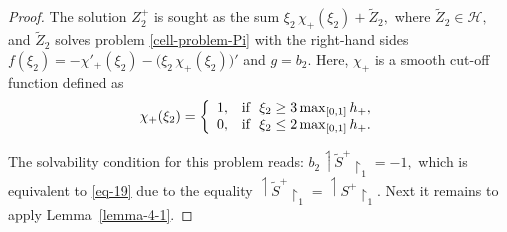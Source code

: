 \documentclass[reqno]{amsart}            %
\numberwithin{equation}{section}
\begin{document}
	\begin{proof}
		The solution $Z^+_2$ is sought as the sum $\xi_2\, \chi_+(\xi_2) + \widetilde{Z}_2,$ where $\widetilde{Z}_2 \in \mathcal{H},$ and  $\widetilde{Z}_2$  solves  problem  \eqref{cell-problem-Pi} with the right-hand sides $f(\xi_2)= -  \chi'_+(\xi_2) - \big(\xi_2\, \chi_+(\xi_2)\big)'$ and $g= b_2.$ Here, $\chi_{+}$ is a smooth cut-off function defined as 
		$$
		\chi_+(\xi_2) = \left\{
		\begin{array}{ll}
			1, & \hbox{if} \ \ \xi_2 \ge 3 \max_{[0,1]}h_+, 
			\\
			0, & \hbox{if }  \  \xi_2 \le 2 \max_{[0,1]}h_+.
		\end{array}
		\right.
		$$
		
		The solvability condition for this problem reads: $b_2 \upharpoonleft\!\! \tilde{S}^+\!\!\upharpoonright_1 = -1,$ which  is equivalent to
		\eqref{eq-19} due to the equality $ \upharpoonleft\!\! \tilde{S}^+\!\!\upharpoonright_1 = \upharpoonleft\!\! {S}^+\!\!\upharpoonright_1.$  
		Next it remains to apply Lemma~\ref{lemma-4-1}.
	\end{proof}
	
\end{document}
